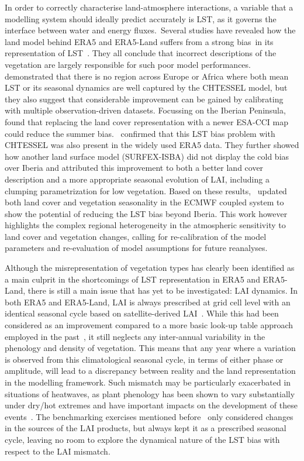 \documentclass[gmd, manuscript]{copernicus}
\begin{document}
{In order to correctly characterise land-atmosphere interactions, a
variable that a modelling system should ideally predict accurately is
LST, as it governs the interface between water and energy
fluxes.~}Several studies have revealed how the land model behind ERA5
and ERA5-Land suffers from a strong bias~in its representation of
LST~\citep{Johannsen_2019,Nogueira_2020,Orth_2017}. They all conclude that incorrect descriptions
of the vegetation are largely responsible for such poor model
performances.~\citet{Orth_2017} demonstrated that there is no region
across Europe or Africa where both mean LST or its seasonal dynamics are
well captured by the CHTESSEL model, but they also suggest that
considerable improvement can be gained by calibrating with multiple
observation-driven datasets. Focussing on the Iberian
Peninsula,~\citet{Johannsen_2019} found that replacing the land cover
representation with a newer ESA-CCI map could reduce the summer
bias.~\citet{Nogueira_2020} confirmed that this LST bias problem with
CHTESSEL was also present in the widely used ERA5 data. They further
showed how another land surface model (SURFEX-ISBA) did not display the
cold bias over Iberia and attributed this improvement to both a better
land cover description and a more appropriate seasonal evolution of
LAI, including a clumping parametrization for low vegetation. Based on
these results,~\citet{Nogueira_2021} updated both land cover and
vegetation seasonality in the ECMWF coupled system to show the potential
of reducing the LST bias beyond Iberia. This work however highlights
the complex regional heterogeneity in the atmospheric sensitivity to
land cover and vegetation changes, calling for re-calibration of the
model parameters and re-evaluation of model assumptions for future
reanalyses.

Although the misrepresentation of vegetation types has clearly been
identified as a main culprit in the shortcomings of LST representation
in ERA5 and ERA5-Land, there is still a main issue that has yet to be
investigated: LAI dynamics. In both ERA5 and ERA5-Land, LAI is always
prescribed at grid cell level with an identical seasonal cycle based on
satellite-derived LAI~\citep{Boussetta_2012}. While this had been
considered as an improvement compared to a more basic look-up table
approach employed in the past~\citep{Boussetta_2012}, it still neglects any
inter-annual variability in the phenology and density of vegetation.
This means that any year where a variation is observed from this
climatological seasonal cycle, in terms of either phase or amplitude,
will lead to a discrepancy between reality and the land representation
in the modelling framework. Such mismatch may be particularly
exacerbated in situations of heatwaves, as plant phenology has been
shown to vary substantially under dry/hot extremes and have important
impacts on the development of these events~\citep{stefanon2012effects, skinner2018amplificationa, Lorenz_2013}. The benchmarking exercises mentioned before~\citep{Johannsen_2019,Nogueira_2020,Nogueira_2021} only considered changes in the sources of the LAI products, but always kept
it as a prescribed seasonal cycle, leaving no room to explore the
dynamical nature of the LST bias with respect to the LAI
mismatch.
\end{document}
